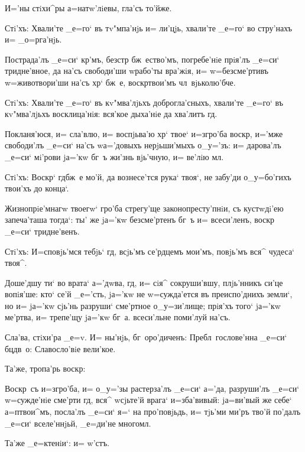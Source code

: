 И='ны стiхи^ры а=натw'лiевы, гла'съ то'йже.

Стi'хъ: Хвали'те _е=го` въ тv"мпа'нjь и= ли'цjь, 
хвали'те _е=го` во стру'нахъ и= _о=рга'нjь.

Пострада'лъ _е=си` кр'мъ, безстр 
бж~ество'мъ, погребе'нiе прiя'лъ _е=си` тридне'вное, да 
на'съ свободи'ши w\т рабо'ты вра'жiя, и= w=безсме'ртивъ 
w=животвори'ши на'съ хр` бж~е, воскр твои'мъ 
чл~вjьколю'бче.

Стi'хъ: Хвали'те _е=го` въ кv"мва'лjьхъ 
доброгла'сныхъ, хвали'те _е=го` въ кv"мва'лjьхъ 
восклица'нiя: вся'кое дыха'нiе да хва'литъ гд.

Покланя'юся, и= сла'влю, и= воспjьва'ю хр` твое` 
и=з\ъ гро'ба воскр, и='мже свободи'лъ _е=си` на'съ 
w\т а='довыхъ нерjьши'мыхъ о_у='зъ: и= дарова'лъ _е=си` 
мi'рови jа='кw бг~ъ жи'знь вjь'чную, и= ве'лiю мл.

Стi'хъ: Воскр` гд бж~е мо'й, да вознесе'тся 
рука` твоя`, не забу'ди о_у=бо'гихъ твои'хъ до конца`.

Жизнопрiе'мнагw твоегw` гро'ба стрегу'ще 
законопресту'пнiи, съ кустwдi'ею запеча'таша тогда`: ты' 
же jа='кw безсме'ртенъ бг~ъ и= всеси'ленъ, воскр 
_е=си` тридне'венъ.

Стi'хъ: И=сповjь'мся тебjь` гд, всjь'мъ се'рдцемъ 
мои'мъ, повjь'мъ вся^ чудеса` твоя^.

Доше'дшу ти` во врата` а='дwва, гд, и= сiя^ 
сокруши'вшу, плjь'нникъ си'це вопiя'ше: кто` се'й 
_е='сть, jа='кw не w=сужда'ется въ преиспо'днихъ земли`, 
но и= jа='кw сjь'нь разруши` сме'ртное о_у=зи'лище; 
прiя'хъ того` jа='кw ме'ртва, и= трепе'щу jа='кw бг~а. 
всеси'льне поми'луй на'съ.

Сла'ва, стiхи'ра _е=v. И= ны'нjь, 
бг~оро'диченъ: Пребл~гослове'нна _е=си` бц дв~о: 
Славосло'вiе вели'кое.

Та'же, тропа'рь воскр:

Воскр~съ и=з\ъ гро'ба, и= о_у='зы растерза'лъ _е=си` 
а='да, разруши'лъ _е=си` w=сужде'нiе сме'рти гд, вся^ 
w\т сjьте'й врага` и=зба'вивый: jа=ви'вый же себе` 
а=п твои^мъ, посла'лъ _е=си` я=` на про'повjьдь, и= 
тjь'ми ми'ръ тво'й по'далъ _е=си` вселе'ннjьй, _е=ди'не 
многомл.

Та'же _е=ктенiи`: и= w'стъ.
